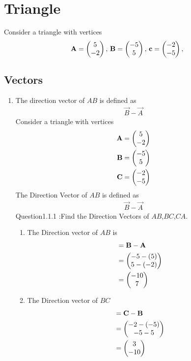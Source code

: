 \documentclass[11pt]{book}
\begin{document}
\frontmatter
\tableofcontents
\setcounter{page}{1}
\mainmatter
\chapter{Triangle}
Consider a triangle with vertices
\begin{align}
\label{eq:tri-pts}
\vec{A}=\myvec{5 \\ -2},\,
\vec{B}=\myvec{-5\\5},\,
	\vec{c}=\myvec{-2\\-5},\,
\end{align}
\section{Vectors}
\begin{enumerate}[label=\thesection.\arabic*.,ref=\thesection.\theenumi]

\item The direction vector of $AB$ is defined as
		\begin{align}
			\vec{B}-
			\vec{A}
		\end{align}
Consider a triangle with vertices
\begin{align} 
 \mathbf{A} &= \begin{pmatrix} 5\\ -2 \end{pmatrix} \\ \mathbf{B} &= \begin{pmatrix} -5\\ 5 \end{pmatrix}
  \\\mathbf{C} &= \begin{pmatrix} -2\\ -5\end{pmatrix}
 \end{align}
The Direction Vector of $AB$ is defined as 
\begin{align} 
\vec{B} - \vec{A}
\end{align}
Question1.1.1 :Find the Direction Vectors of $AB$,$BC$,$CA$.\\
\solution

\begin{enumerate} 
\item  The Direction vector of $AB$ is \begin{align} &= \mathbf{B} - \mathbf{A} \\
 &= \begin{pmatrix}-5 - (5)\\ 5 - (-2) \end{pmatrix} \\&= \begin{pmatrix} -10\\ 7 \end{pmatrix}
 \end{align}
 
\item The Direction vector of $BC$ \begin{align}&= \vec{C} - \vec{B}\\
 &= \myvec{ -2 - (-5)\\ -5 - 5 } \\&= \myvec{3\\ -10 }
  \end{align}
  

\end{enumerate}
\end{enumerate}
\end{document}
